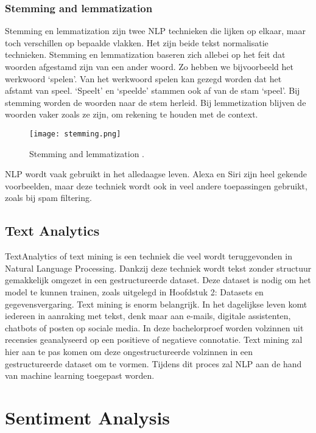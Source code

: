 \subsubsection{Stemming and lemmatization}
\label{sec:stemming}

Stemming en lemmatization zijn twee NLP technieken die lijken op elkaar, maar toch verschillen op bepaalde vlakken. Het zijn beide tekst normalisatie technieken. Stemming en lemmatization baseren zich allebei op het feit dat woorden afgestamd zijn van een ander woord. Zo hebben we bijvoorbeeld het werkwoord ‘spelen’. Van het werkwoord spelen kan gezegd worden dat het afstamt van speel. ‘Speelt’ en ‘speelde’ stammen ook af van de stam ‘speel’. Bij stemming worden de woorden naar de stem herleid. Bij lemmetization blijven de woorden vaker zoals ze zijn, om rekening te houden met de context. \autocite{sas2020}

\begin{figure}[!htbp]
    \texttt{[image: stemming.png]}
    \caption{\label{stemming}Stemming and lemmatization \autocite{sas2020}.}
\end{figure}
\FloatBarrier

NLP wordt vaak gebruikt in het alledaagse leven. Alexa en Siri zijn heel gekende voorbeelden, maar deze techniek wordt ook in veel andere toepassingen gebruikt, zoals bij spam filtering. 

\subsection{Text Analytics}
\label{sec:textanalytics}

\gls{TextAnalytics} of text mining is een techniek die veel wordt teruggevonden in Natural Language Processing. Dankzij deze techniek wordt tekst zonder structuur gemakkelijk omgezet in een gestructureerde dataset. \autocite{Linguamatics2021} Deze dataset is nodig om het model te kunnen trainen, zoals uitgelegd in Hoofdstuk 2: Datasets en gegevensvergaring.
Text mining is enorm belangrijk. In het dagelijkse leven komt iedereen in aanraking met tekst, denk maar aan e-mails, digitale assistenten, chatbots of posten op sociale media. In deze bachelorproef worden volzinnen uit recensies geanalyseerd op een positieve of negatieve connotatie. Text mining zal hier aan te pas komen om deze ongestructureerde volzinnen in een gestructureerde dataset om te vormen. Tijdens dit proces zal NLP aan de hand van machine learning toegepast worden. 

\section{Sentiment Analysis}
\label{sec:sentimentanalysis}


